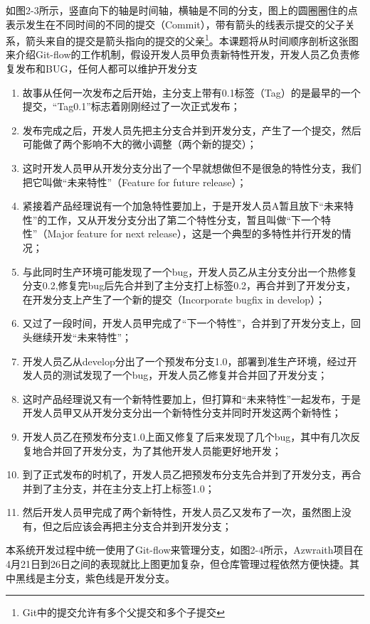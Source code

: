 如图2-3所示，竖直向下的轴是时间轴，横轴是不同的分支，图上的圆圈圈住的点表示发生在不同时间的不同的提交（Commit），带有箭头的线表示提交的父子关系，箭头来自的提交是箭头指向的提交的父亲\footnote{Git中的提交允许有多个父提交和多个子提交}。本课题将从时间顺序剖析这张图来介绍Git-flow的工作机制，假设开发人员甲负责新特性开发，开发人员乙负责修复发布和BUG，任何人都可以维护开发分支
\begin{enumerate}
  \item 故事从任何一次发布之后开始，主分支上带有0.1标签（Tag）的是最早的一个提交，“Tag0.1”标志着刚刚经过了一次正式发布；
  \item 发布完成之后，开发人员先把主分支合并到开发分支，产生了一个提交，然后可能做了两个影响不大的微小调整（两个新的提交）；
  \item 这时开发人员甲从开发分支分出了一个早就想做但不是很急的特性分支，我们把它叫做“未来特性”（Feature for future release）；
  \item 紧接着产品经理说有一个加急特性要加上，于是开发人员A暂且放下“未来特性”的工作，又从开发分支分出了第二个特性分支，暂且叫做“下一个特性”（Major feature for next release），这是一个典型的多特性并行开发的情况；
  \item 与此同时生产环境可能发现了一个bug，开发人员乙从主分支分出一个热修复分支0.2,修复完bug后先合并到了主分支打上标签0.2，再合并到了开发分支，在开发分支上产生了一个新的提交（Incorporate bugfix in develop）；
  \item 又过了一段时间，开发人员甲完成了“下一个特性”，合并到了开发分支上，回头继续开发“未来特性”；
  \item 开发人员乙从develop分出了一个预发布分支1.0，部署到准生产环境，经过开发人员的测试发现了一个bug，开发人员乙修复并合并回了开发分支；
  \item 这时产品经理说又有一个新特性要加上，但打算和“未来特性”一起发布，于是开发人员甲又从开发分支分出一个新特性分支并同时开发这两个新特性；
  \item 开发人员乙在预发布分支1.0上面又修复了后来发现了几个bug，其中有几次反复地合并回了开发分支，为了其他开发人员能更好地开发；
  \item 到了正式发布的时机了，开发人员乙把预发布分支先合并到了开发分支，再合并到了主分支，并在主分支上打上标签1.0；
  \item 然后开发人员甲完成了两个新特性，开发人员乙又发布了一次，虽然图上没有，但之后应该会再把主分支合并到开发分支；
\end{enumerate}

本系统开发过程中统一使用了Git-flow来管理分支，如图2-4所示，Azwraith项目在4月21日到26日之间的表现就比上图更加复杂，但仓库管理过程依然方便快捷。其中黑线是主分支，紫色线是开发分支。

